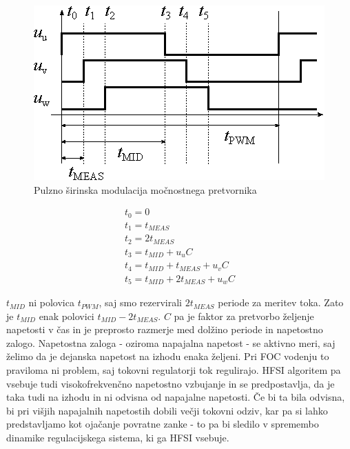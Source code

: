 \documentclass[a4paper,twoside,openright,12pt,slovene]{book}
\begin{document}
\begin{figure}[!htbp]
    \centering
    \includegraphics[width=1\columnwidth]{Slike/Inkscape/PWM.eps}
    \caption{\label{PWM} Pulzno širinska modulacija močnostnega pretvornika }
\end{figure}

\begin{equation} \label{izracunPWM}
\begin{gathered}
    t_0 = 0  \\
    t_1 = t_{MEAS}  \\
    t_2 = 2t_{MEAS}  \\
    t_3 = t_{MID} + u_uC  \\
    t_4 = t_{MID} + t_{MEAS} + u_vC \\
    t_5 = t_{MID} + 2t_{MEAS} + u_wC
\end{gathered}
\end{equation}

$t_{MID}$ ni polovica $t_{PWM}$, saj smo rezervirali $2t_{MEAS}$ periode za meritev toka. Zato je $t_{MID}$ enak polovici $t_{MID} - 2t_{MEAS}$. $C$ pa je faktor za pretvorbo željenje napetosti v
čas in je preprosto razmerje med dolžino periode in napetostno zalogo. Napetostna zaloga - oziroma napajalna napetost - se aktivno meri, saj želimo da je dejanska napetost na izhodu enaka željeni. Pri
FOC vodenju to praviloma ni problem, saj tokovni regulatorji tok regulirajo. HFSI algoritem pa vsebuje tudi visokofrekvenčno napetostno vzbujanje in se predpostavlja, da je taka tudi na izhodu in ni
odvisna od napajalne napetosti. Če bi ta bila odvisna, bi pri višjih napajalnih napetostih dobili večji tokovni odziv, kar pa si lahko predstavljamo kot ojačanje povratne zanke - to pa bi sledilo v
spremembo dinamike regulacijskega sistema, ki ga HFSI vsebuje.
\end{document}
